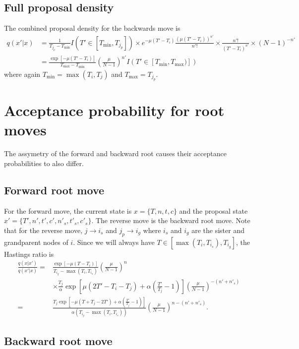 \documentclass[a4paper,11pt]{article}
\begin{document}
\subsection{Full proposal density}

The combined proposal density for the backwards move is
\begin{align}
  q(x'|x) &= \frac{1}{T_{j_p}-T_{\min}}I(T'\in[T_{\min},T_{j_p}])
\times e^{-\mu(T'-T_i)}\frac{(\mu(T'-T_i))^{n'}}{n'!}
\times \frac{n'!}{(T'-T_i)^{n'}}
\times (N-1)^{-n'}\nonumber\\
&=\frac{\exp[-\mu(T'-T_i)]}{T_{\max}-T_{\min}}\left(\frac{\mu}{N-1}\right)^{n'}
I(T'\in[T_{\min},T_{\max})])
\end{align}
where again $T_{\min}=\max(T_i,T_j)$ and $T_{\max}=T_{j_p}$.

\section{Acceptance probability for root moves}

The assymetry of the forward and backward root causes their acceptance
probabilities to also differ.

\subsection{Forward root move}

For the forward move, the current state is $x=\{T,n,t,c\}$ and the
proposal state $x'=\{T',n',t',c',n'_s,t'_s,c'_s\}$. The reverse move
is the backward root move. Note that for the reverse move,
$j\rightarrow i_s$ and $j_p\rightarrow i_g$ where $i_s$ and $i_g$ are
the sister and grandparent nodes of $i$. Since we will always have
$T\in[\max(T_i,T_{i_s}),T_{i_g}]$, the Hastings ratio is
\begin{align}
  \frac{q(x|x')}{q(x'|x)}
=& \frac{\exp[-\mu(T-T_i)]}{T_{i_g}-\max(T_i,T_{i_s})}\left(\frac{\mu}{N-1}\right)^n\\
&\times
\frac{T_j}{\alpha}\exp\left[\mu(2T'-T_i-T_j)+\alpha\left(\frac{T'}{T_j}-1\right)\right]\left(\frac{\mu}{N-1}\right)^{-(n'+n'_s)}\nonumber\\
=& \frac{T_j\exp\left[-\mu(T+T_j-2T')+\alpha\left(\frac{T'}{T_j}-1\right)\right]}{\alpha(T_{i_g}-\max(T_i,T_{i_s}))}\left(\frac{\mu}{N-1}\right)^{n-(n'+n'_s)}.\nonumber
\end{align}

\subsection{Backward root move}
\end{document}
